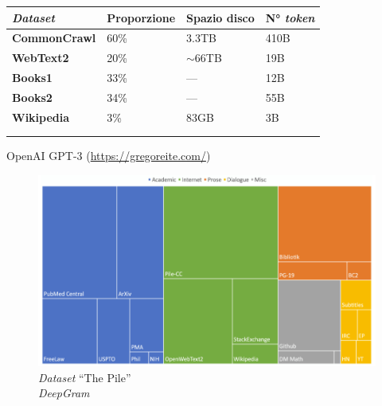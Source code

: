 \begin{frame}[t]
{\begin{minipage}[t]{\textwidth}
\begin{minipage}[t]{.49\textwidth}
            \vspace*{-.5cm}
            {\tiny
                \begin{table}
                    \renewcommand{\arraystretch}{1}
                    \centering
                    \begin{tabularx}{\textwidth}{Xp{.9cm}p{1cm}p{.7cm}}
                        \toprule
                        \textbf{\emph{Dataset}} & \textbf{Proporzione} & \textbf{Spazio disco} & N° \emph{token}\\
                        \midrule
                        \textbf{CommonCrawl} & 60\% & 3.3TB & 410B\\
                        \textbf{WebText2} & 20\% & $\sim$66TB & 19B\\
                        \textbf{Books1} & 33\% & --- & 12B\\
                        \textbf{Books2} & 34\% & --- & 55B\\
                        \textbf{Wikipedia} & 3\% & 83GB & 3B\\
                        &&&\\
                        &&&\\
                        \bottomrule
                    \end{tabularx}
                    OpenAI GPT-3 (\url{https://gregoreite.com/})
                \end{table}
            }
        \end{minipage}
    \end{minipage}
    \begin{minipage}[t]{\textwidth}
        \begin{figure}
            \centering
            \includegraphics[width=.5\textwidth]{img/ThePile-dataset-composition-crop-no-bg.png}
            {\tiny\\\textit{Dataset} ``The Pile''\\\vspace*{-1pt}\textit{\textcopyright DeepGram}}
        \end{figure}
    \end{minipage}
}
\end{frame}
